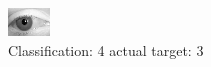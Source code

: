 \begin{figure}[h!]
\begin{center}
\includegraphics[width=0.60\columnwidth]{figures/ID2812_class_4_target_3.png}
\end{center}
\caption{ Classification: 4 actual target: 3}
\label{fig:ID2812_class_4_target_3}
\end{figure}
